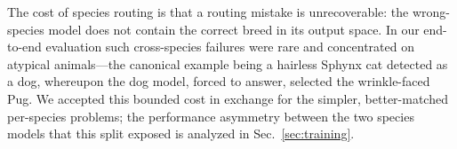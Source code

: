 The cost of species routing is that a routing mistake is unrecoverable: the
wrong-species model does not contain the correct breed in its output space.
In our end-to-end evaluation such cross-species failures were rare and
concentrated on atypical animals---the canonical example being a hairless
Sphynx cat detected as a dog, whereupon the dog model, forced to answer,
selected the wrinkle-faced Pug. We accepted this bounded cost in exchange for
the simpler, better-matched per-species problems; the performance asymmetry
between the two species models that this split exposed is analyzed in
Sec.~\ref{sec:training}.
